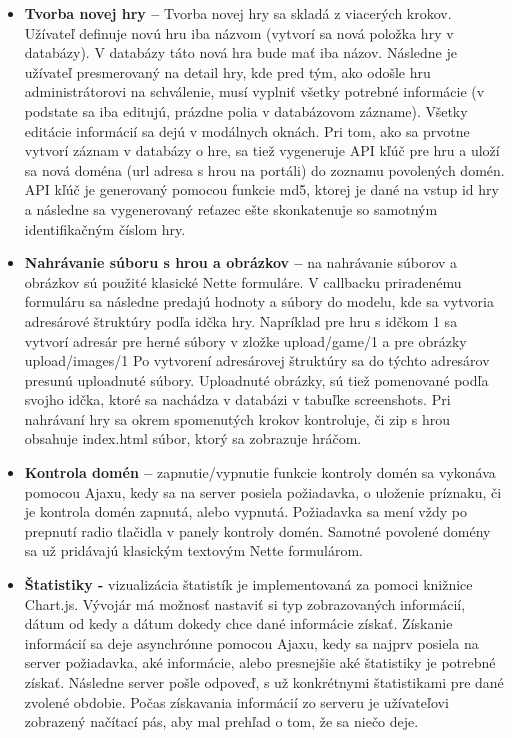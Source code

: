 \begin{itemize}  
\item \textbf{Tvorba novej hry –} Tvorba novej hry sa skladá z viacerých krokov. Užívateľ definuje novú hru iba názvom (vytvorí sa nová položka hry v databázy). V databázy táto nová hra bude mať iba názov. Následne je užívateľ presmerovaný na detail hry, kde pred tým, ako odošle hru administrátorovi na schválenie, musí vyplniť všetky potrebné informácie (v podstate sa iba editujú, prázdne polia v databázovom zázname). Všetky editácie informácií sa dejú v modálnych oknách. Pri tom, ako sa prvotne vytvorí záznam v databázy o hre, sa tiež vygeneruje API kľúč pre hru a uloží sa nová doména (url adresa s hrou na portáli) do zoznamu povolených domén. API kľúč je generovaný pomocou funkcie md5, ktorej je dané na vstup id hry a následne sa vygenerovaný reťazec ešte skonkatenuje so samotným identifikačným číslom hry.  
\item \textbf{Nahrávanie súboru s hrou a obrázkov –} na nahrávanie súborov a obrázkov sú použité klasické Nette formuláre. V callbacku priradenému formuláru sa následne predajú hodnoty a súbory do modelu, kde sa vytvoria adresárové štruktúry podľa idčka hry. Napríklad pre hru s idčkom 1 sa vytvorí adresár pre herné súbory v zložke upload/game/1 a pre obrázky upload/images/1 Po vytvorení adresárovej štruktúry sa do týchto adresárov presunú uploadnuté súbory. Uploadnuté obrázky, sú tiež pomenované podľa svojho idčka, ktoré sa nachádza v databázi v tabuľke screenshots. Pri nahrávaní hry sa okrem spomenutých krokov kontroluje, či zip s hrou obsahuje index.html súbor, ktorý sa zobrazuje hráčom. 
\item \textbf{Kontrola domén –} zapnutie/vypnutie funkcie kontroly domén sa vykonáva pomocou Ajaxu, kedy sa na server posiela požiadavka, o uloženie príznaku, či je kontrola domén zapnutá, alebo vypnutá. Požiadavka sa mení vždy po prepnutí radio tlačidla v panely kontroly domén. Samotné povolené domény sa už pridávajú klasickým textovým Nette formulárom.  
\item \textbf{Štatistiky -} vizualizácia štatistík je implementovaná za pomoci knižnice Chart.js. Vývojár má možnosť nastaviť si typ zobrazovaných informácií, dátum od kedy a dátum dokedy chce dané informácie získať. Získanie informácií sa deje asynchrónne pomocou Ajaxu, kedy sa najprv posiela na server požiadavka, aké informácie, alebo presnejšie aké štatistiky je potrebné získať. Následne server pošle odpoveď, s už konkrétnymi štatistikami pre dané zvolené obdobie. Počas získavania informácií zo serveru je užívateľovi zobrazený načítací pás, aby mal prehľad o tom, že sa niečo deje. 

\end{itemize}

